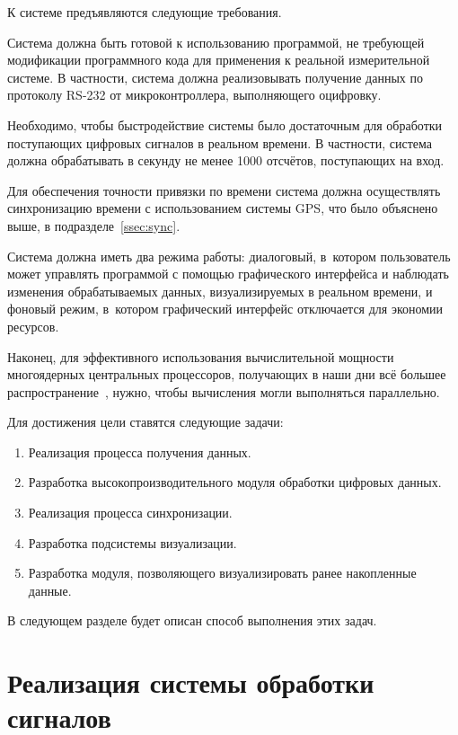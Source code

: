 \documentclass[a4paper, 14pt]{extarticle}
\begin{document}
  К системе предъявляются следующие требования.

  Система должна быть готовой к использованию программой, не требующей модификации программного кода
  для применения к реальной измерительной системе. В частности, система должна реализовывать
  получение данных по протоколу RS-232\cite{sweet-serial} от микроконтроллера, выполняющего оцифровку.

  Необходимо, чтобы быстродействие системы было достаточным для обработки поступающих цифровых
  сигналов в реальном времени. В частности, система должна обрабатывать в секунду не менее 1000
  отсчётов, поступающих на вход.

  Для обеспечения точности привязки по времени система должна осуществлять синхронизацию времени с
  использованием системы GPS, что было объяснено выше, в подразделе~\ref{ssec:sync}.

  Система должна иметь два режима работы: диалоговый, в~котором пользователь может управлять
  программой с помощью графического интерфейса и наблюдать изменения обрабатываемых данных,
  визуализируемых в реальном времени, и фоновый режим, в~котором графический интерфейс отключается
  для экономии ресурсов.

  Наконец, для эффективного использования вычислительной мощности многоядерных центральных
  процессоров, получающих в наши дни всё большее распространение~\cite{steam-hardware}, нужно, чтобы
  вычисления могли выполняться параллельно.

  Для достижения цели ставятся следующие задачи:
  \begin{enumerate}
    \item Реализация процесса получения данных.
    \item Разработка высокопроизводительного модуля обработки цифровых данных.
    \item Реализация процесса синхронизации.
    \item Разработка подсистемы визуализации.
    \item Разработка модуля, позволяющего визуализировать ранее накопленные данные.
  \end{enumerate}

  В следующем разделе будет описан способ выполнения этих задач.

  \section{Реализация системы обработки сигналов}\label{sec:impl}
\end{document}
